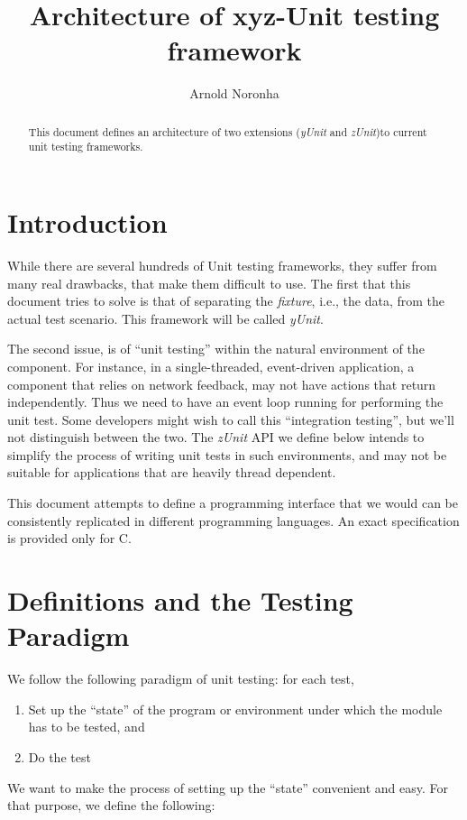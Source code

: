 \documentclass{article}
\title{Architecture of xyz-Unit testing framework}
\author{Arnold Noronha}
\begin{document}
\maketitle
\begin{abstract}
This document defines an architecture of two extensions (\emph{yUnit} and \emph{zUnit})to current
unit testing frameworks.
\end{abstract}

\section{Introduction}

While there are several hundreds of Unit testing frameworks, they
suffer from many real drawbacks, that make them difficult to use. The
first that this document tries to solve is that of separating the
\emph{fixture}, i.e., the data, from the actual test scenario. This
framework will be called \emph{yUnit}. 

The second issue, is of ``unit
testing'' within the natural environment of the component. For
instance, in a single-threaded, event-driven application, a component
that relies on network feedback, may not have actions that return
independently. Thus we need to have an event loop running for
performing the unit test. Some developers might wish to call this
``integration testing'', but we'll not distinguish between the
two. The \emph{zUnit} API we define below intends to simplify the
process of writing unit tests in such environments, and may not be
suitable for applications that are heavily thread dependent.

This document attempts to define a programming interface that we
would can be consistently replicated in different programming
languages. An exact specification is provided only for C.


\section{Definitions and the Testing Paradigm}

We follow the following paradigm of unit testing: for each test,
\begin{enumerate}
\item Set up the ``state'' of the program or environment under which
  the module has to be tested, and
\item Do the test
\end{enumerate}

We want to make the process of setting up the ``state'' convenient and
easy. For that purpose, we define the following:
\end{document}
